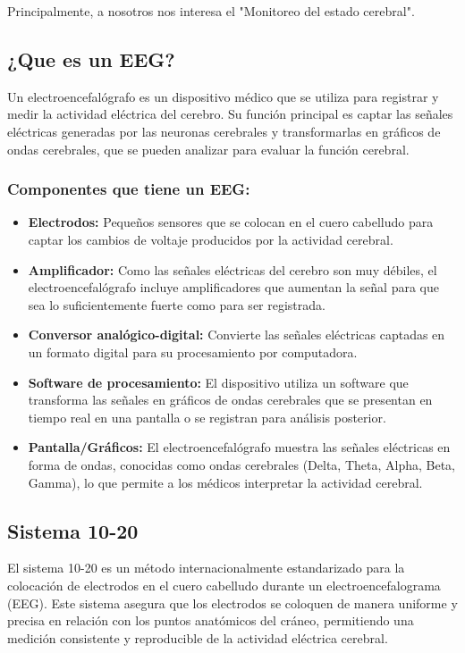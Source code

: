 \documentclass{article}
\begin{document}
Principalmente, a nosotros nos interesa el "Monitoreo del estado cerebral".

\subsection{¿Que es un EEG?}

Un electroencefalógrafo es un dispositivo médico que se utiliza para registrar y medir la actividad eléctrica del cerebro. Su función principal es captar las señales eléctricas generadas por las neuronas cerebrales y transformarlas en gráficos de ondas cerebrales, que se pueden analizar para evaluar la función cerebral.
\subsubsection{Componentes que tiene un EEG:}
\begin{itemize}
    \item \textbf{Electrodos:} Pequeños sensores que se colocan en el cuero cabelludo para captar los cambios de voltaje producidos por la actividad cerebral.
    \item \textbf{Amplificador:} Como las señales eléctricas del cerebro son muy débiles, el electroencefalógrafo incluye amplificadores que aumentan la señal para que sea lo suficientemente fuerte como para ser registrada.
    \item \textbf{Conversor analógico-digital:} Convierte las señales eléctricas captadas en un formato digital para su procesamiento por computadora.
    \item \textbf{Software de procesamiento:} El dispositivo utiliza un software que transforma las señales en gráficos de ondas cerebrales que se presentan en tiempo real en una pantalla o se registran para análisis posterior.
    \item \textbf{Pantalla/Gráficos:} El electroencefalógrafo muestra las señales eléctricas en forma de ondas, conocidas como ondas cerebrales (Delta, Theta, Alpha, Beta, Gamma), lo que permite a los médicos interpretar la actividad cerebral.
\end{itemize}

\subsection{Sistema 10-20}

El sistema 10-20 es un método internacionalmente estandarizado para la colocación de electrodos en el cuero cabelludo durante un electroencefalograma (EEG). Este sistema asegura que los electrodos se coloquen de manera uniforme y precisa en relación con los puntos anatómicos del cráneo, permitiendo una medición consistente y reproducible de la actividad eléctrica cerebral.
\end{document}

